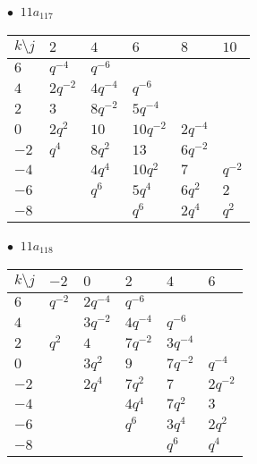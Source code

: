 \begin{minipage}{\linewidth}
$\bullet\ $ $11a_{117}$ \vspace{0.5em} \\
\begin{tabular}{l|lllll}
$k \setminus j$ & $2$ & $4$ & $6$ & $8$ & $10$ \\
\hline
$6$ & $q^{-4}$ & $q^{-6}$ &  &  &  \\
$4$ & $2q^{-2}$ & $4q^{-4}$ & $q^{-6}$ &  &  \\
$2$ & $3$ & $8q^{-2}$ & $5q^{-4}$ &  &  \\
$0$ & $2q^{2}$ & $10$ & $10q^{-2}$ & $2q^{-4}$ &  \\
$-2$ & $q^{4}$ & $8q^{2}$ & $13$ & $6q^{-2}$ &  \\
$-4$ &  & $4q^{4}$ & $10q^{2}$ & $7$ & $q^{-2}$ \\
$-6$ &  & $q^{6}$ & $5q^{4}$ & $6q^{2}$ & $2$ \\
$-8$ &  &  & $q^{6}$ & $2q^{4}$ & $q^{2}$ \\
\end{tabular}
\vspace{2em}
\end{minipage}
%
\begin{minipage}{\linewidth}
$\bullet\ $ $11a_{118}$ \vspace{0.5em} \\
\begin{tabular}{l|lllll}
$k \setminus j$ & $-2$ & $0$ & $2$ & $4$ & $6$ \\
\hline
$6$ & $q^{-2}$ & $2q^{-4}$ & $q^{-6}$ &  &  \\
$4$ &  & $3q^{-2}$ & $4q^{-4}$ & $q^{-6}$ &  \\
$2$ & $q^{2}$ & $4$ & $7q^{-2}$ & $3q^{-4}$ &  \\
$0$ &  & $3q^{2}$ & $9$ & $7q^{-2}$ & $q^{-4}$ \\
$-2$ &  & $2q^{4}$ & $7q^{2}$ & $7$ & $2q^{-2}$ \\
$-4$ &  &  & $4q^{4}$ & $7q^{2}$ & $3$ \\
$-6$ &  &  & $q^{6}$ & $3q^{4}$ & $2q^{2}$ \\
$-8$ &  &  &  & $q^{6}$ & $q^{4}$ \\
\end{tabular}
\vspace{2em}
\end{minipage}
%

